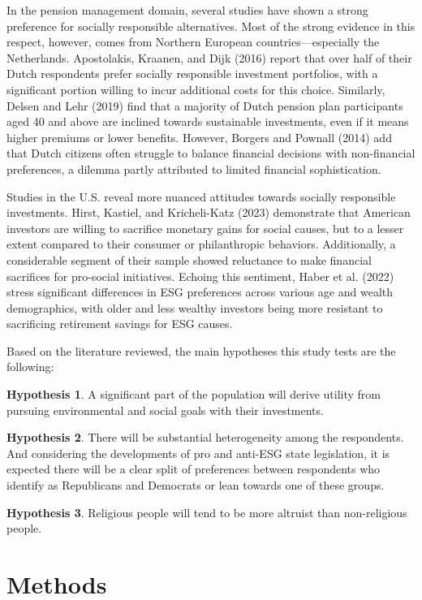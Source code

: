 \documentclass[
  12pt,
]{article}
\begin{document}
In the pension management domain, several studies have shown a strong preference for socially responsible alternatives. Most of the strong evidence in this respect, however, comes from Northern European countries---especially the Netherlands. Apostolakis, Kraanen, and Dijk (2016) report that over half of their Dutch respondents prefer socially responsible investment portfolios, with a significant portion willing to incur additional costs for this choice. Similarly, Delsen and Lehr (2019) find that a majority of Dutch pension plan participants aged 40 and above are inclined towards sustainable investments, even if it means higher premiums or lower benefits. However, Borgers and Pownall (2014) add that Dutch citizens often struggle to balance financial decisions with non-financial preferences, a dilemma partly attributed to limited financial sophistication.

Studies in the U.S. reveal more nuanced attitudes towards socially responsible investments. Hirst, Kastiel, and Kricheli-Katz (2023) demonstrate that American investors are willing to sacrifice monetary gains for social causes, but to a lesser extent compared to their consumer or philanthropic behaviors. Additionally, a considerable segment of their sample showed reluctance to make financial sacrifices for pro-social initiatives. Echoing this sentiment, Haber et al. (2022) stress significant differences in ESG preferences across various age and wealth demographics, with older and less wealthy investors being more resistant to sacrificing retirement savings for ESG causes.

Based on the literature reviewed, the main hypotheses this study tests are the following:

\textbf{Hypothesis 1}. A significant part of the population will derive utility from pursuing environmental and social goals with their investments.

\textbf{Hypothesis 2}. There will be substantial heterogeneity among the respondents. And considering the developments of pro and anti-ESG state legislation, it is expected there will be a clear split of preferences between respondents who identify as Republicans and Democrats or lean towards one of these groups.

\textbf{Hypothesis 3}. Religious people will tend to be more altruist than non-religious people.

\hypertarget{methods}{%
\section{Methods}\label{methods}}
\end{document}
